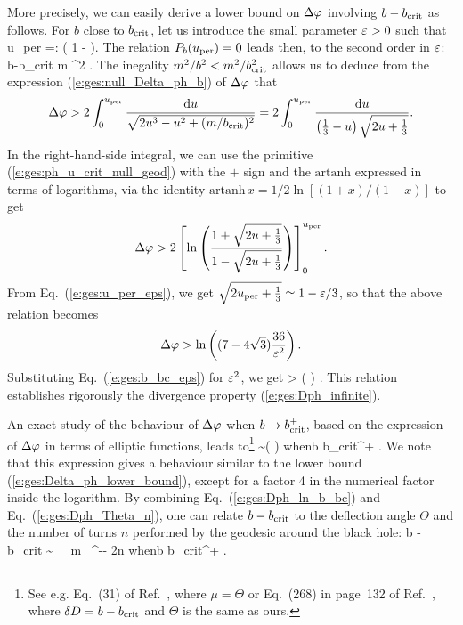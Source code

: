 More precisely, we can easily derive a lower bound on $\Delta\varphi$ involving
$b-b_{\rm crit}$ as follows. For $b$ close to $b_{\rm crit}$, let us introduce
the small parameter $\varepsilon >0$ such that
\be \label{e:ges:u_per_eps}
    u_{\rm per} =:  ( 1 - \veps ).
\ee
The relation $P_b(u_{\rm per}) = 0$ leads then, to the second order in $\varepsilon$:
\be \label{e:ges:b_bc_eps}
    b-b_{\rm crit} \simeq {} m \veps^2 .
\ee
The inegality $m^2/b^2 < m^2/b_{\rm crit}^2$ allows us to deduce from the expression
(\ref{e:ges:null_Delta_ph_b}) of $\Delta\varphi$ that
\[
    \Delta\varphi > 2 \int_0^{u_{\rm per}} \frac{\mathrm{d} u}{\sqrt{2 u^3 - u^2 + (m/b_{\rm crit})^2}}
      = 2 \int_0^{u_{\rm per}} \frac{\mathrm{d} u}{\left(\frac{1}{3} - u \right)
        \sqrt{2u + \frac{1}{3}}} .
\]
In the right-hand-side integral, we can use the primitive (\ref{e:ges:ph_u_crit_null_geod})
with the $+$ sign and the $\mathrm{artanh}$ expressed in terms of logarithms,
via the identity $\mathrm{artanh}\,  x = 1/2\ln[(1+x)/(1-x)]$ to get
\[
   \Delta\varphi > 2 \left[
   \ln \left( \frac{1 + \sqrt{2u + \frac{1}{3}}}{1 - \sqrt{2u + \frac{1}{3}}} \right)
   \right] _0^{u_{\rm per}} .
\]
From Eq.~(\ref{e:ges:u_per_eps}), we get $\sqrt{2u_{\rm per} + \frac{1}{3}} \simeq 1 - \varepsilon/3$,
so that the above relation becomes
\[
    \Delta\varphi > \ln\left( (7 - 4 \sqrt{3}) \frac{36}{\varepsilon^2} \right) .
\]
Substituting Eq.~(\ref{e:ges:b_bc_eps}) for $\varepsilon^2$, we get
\be \label{e:ges:Delta_ph_lower_bound}
    \Delta\ph > \ln\left(  \right) .
\ee
This relation establishes rigorously the divergence property
(\ref{e:ges:Dph_infinite}).

An exact study of the behaviour of $\Delta\varphi$ when $b \to b_{\rm crit}^+$,
based on the expression of $\Delta\varphi$ in terms of elliptic functions, leads
to\footnote{See e.g. Eq.~(31) of Ref.~\cite{Darwi59}, where $\mu = \Theta$
or Eq.~(268) in page~132 of Ref.~\cite{Chand83}, where $\delta D = b-b_{\rm crit}$ and
$\Theta$ is the same as ours.}
\be \label{e:ges:Dph_ln_b_bc}
    \Delta\ph \sim \ln\left(  \right)
    \qquad\mbox{when}\quad b \to b_{\rm crit}^+ .
\ee
We note that this expression gives a behaviour similar to the lower bound
(\ref{e:ges:Delta_ph_lower_bound}), except for a factor 4 in the numerical
factor inside the logarithm.
By combining Eq.~(\ref{e:ges:Dph_ln_b_bc}) and Eq.~(\ref{e:ges:Dph_Theta_n}),
one can relate $b - b_{\rm crit}$ to the deflection angle $\Theta$
and the number of turns $n$ performed by the geodesic around the black hole:
\be \label{e:ges:b_bc_exp_Theta}
    b - b_{\rm crit} \sim
    _{} m \, ^{-\Theta - 2\pi n}
    \qquad\mbox{when}\quad b \to b_{\rm crit}^+ .
\ee


